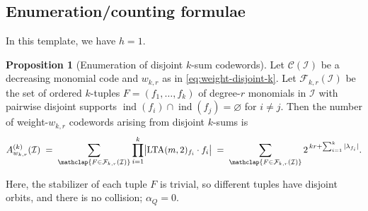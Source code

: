 \documentclass[conference]{IEEEtran}
\theoremstyle{definition}
\newtheorem{proposition}{Proposition}
\newcommand{\I}{\mathcal{I}}
\newcommand{\C}{\mathcal{C}}
\newcommand{\ind}{\operatorname{ind}}
\newcommand{\Alow}{{\rm LTA}(m,2)}
\begin{document}
\subsection{Enumeration/counting formulae}
In this template, we have $h=1$.
\begin{proposition}[Enumeration of disjoint $k$-sum codewords]
\label{prop:k-disjoint-enum-decreasing-final}
Let $\C(\I)$ be a decreasing monomial code and $w_{k,r}$ as in
\eqref{eq:weight-disjoint-k}.  Let $\mathcal F_{k,r}(\I)$ be the set of
ordered $k$-tuples $F=(f_1,\dots,f_k)$ of degree-$r$ monomials in $\I$
with pairwise disjoint supports $\ind(f_i)\cap\ind(f_j)=\varnothing$
for $i\neq j$. Then the number of weight-$w_{k,r}$ codewords arising
from disjoint $k$-sums is
\begin{equation}
  \label{eq:A-k-disjoint-decreasing-final}
  A_{w_{k,r}}^{(k)}(\I)
\;=\;
\sum_{\mathclap{F\in\mathcal F_{k,r}(\I)}}
  \prod_{i=1}^k \bigl|\Alow_{f_i}\cdot f_i\bigr|
\;=\;
\sum_{\mathclap{F\in\mathcal F_{k,r}(\I)}}
  2^{\,k r + \sum_{i=1}^k |\lambda_{f_i}|}.
\end{equation}
\end{proposition}

Here, the stabilizer of each tuple $F$ is trivial, so different
tuples have disjoint orbits, and there is no collision; $\alpha_Q=0$.











\end{document}
